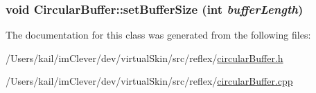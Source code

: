 \label{class_circular_buffer_a279c6c54d6a7f1f94d3d5311dc8a631f}
\hypertarget{class_circular_buffer_ae9f2d25b6b0a7f2eda25147a0bfbac93}{
\subsubsection[{setBufferSize}]{\setlength{\rightskip}{0pt plus 5cm}void CircularBuffer::setBufferSize (int {\em bufferLength})}}
\label{class_circular_buffer_ae9f2d25b6b0a7f2eda25147a0bfbac93}


The documentation for this class was generated from the following files:\begin{DoxyCompactItemize}
\item 
/Users/kail/imClever/dev/virtualSkin/src/reflex/\hyperlink{circular_buffer_8h}{circularBuffer.h}\item 
/Users/kail/imClever/dev/virtualSkin/src/reflex/\hyperlink{circular_buffer_8cpp}{circularBuffer.cpp}\end{DoxyCompactItemize}
